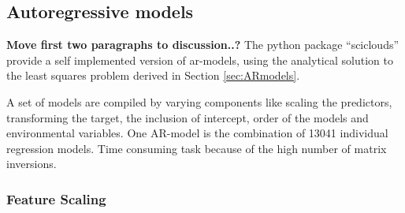\subsection{Autoregressive models}
\textbf{Move first two paragraphs to discussion..?}
The python package ``sciclouds'' provide a self implemented version of \acrshort{ar}-models, using the analytical solution to the least squares problem derived in Section \ref{sec:ARmodels}. 

A set of models are compiled by varying components like scaling the predictors, transforming the target, the inclusion of intercept, order of the models and environmental variables. One AR-model is the combination of 13041 individual regression models. Time consuming task because of the high number of matrix inversions. 




\subsubsection{Feature Scaling} \label{sec:scaling_predictors}

